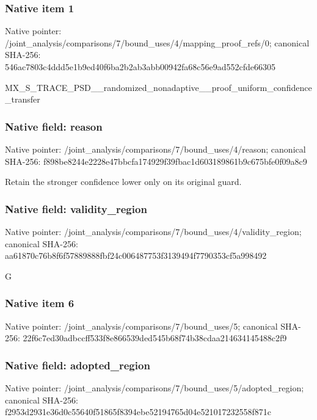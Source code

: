 \documentclass[10pt,a4paper]{article}
\begin{document}
\subsubsection{Native item 1}
Native pointer: /joint\_\allowbreak{}analysis/comparisons/7/bound\_\allowbreak{}uses/4/mapping\_\allowbreak{}proof\_\allowbreak{}refs/0; canonical SHA-256: 546ac7803c4ddd5e1b9ed40f6ba2b2ab3abb00942fa68c56e9ad552cfde66305

\begingroup\raggedright\sloppy MX\_\allowbreak{}S\_\allowbreak{}TRACE\_\allowbreak{}PSD\_\allowbreak{}\_\allowbreak{}randomized\_\allowbreak{}nonadaptive\_\allowbreak{}\_\allowbreak{}proof\_\allowbreak{}uniform\_\allowbreak{}confidence\_\allowbreak{}transfer\par\endgroup

\subsubsection{Native field: reason}
Native pointer: /joint\_\allowbreak{}analysis/comparisons/7/bound\_\allowbreak{}uses/4/reason; canonical SHA-256: f898be8244e2228e47bbcfa174929f39fbac1d603189861b9c675bfe0f09a8c9

\begingroup\raggedright\sloppy Retain the stronger confidence lower only on its original guard.\par\endgroup

\subsubsection{Native field: validity\_\allowbreak{}region}
Native pointer: /joint\_\allowbreak{}analysis/comparisons/7/bound\_\allowbreak{}uses/4/validity\_\allowbreak{}region; canonical SHA-256: aa61870c76b8f6f57889888fbf24c006487753f3139494f7790353cf5a998492

\begingroup\raggedright\sloppy G\par\endgroup

\subsubsection{Native item 6}
Native pointer: /joint\_\allowbreak{}analysis/comparisons/7/bound\_\allowbreak{}uses/5; canonical SHA-256: 22f6c7ed30adbccff533f8e866539ded545b68f74b38cdaa214634145488c2f9

\subsubsection{Native field: adopted\_\allowbreak{}region}
Native pointer: /joint\_\allowbreak{}analysis/comparisons/7/bound\_\allowbreak{}uses/5/adopted\_\allowbreak{}region; canonical SHA-256: f2953d2931e36d0c55640f51865f8394ebe52194765d04e521017232558f871c
\end{document}
